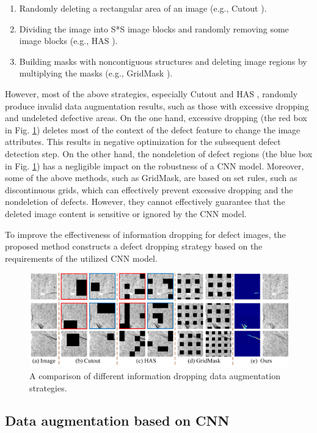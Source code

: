 \documentclass[sn-mathphys]{sn-jnl}%
\theoremstyle{thmstyleone}%
\theoremstyle{thmstyletwo}%
\theoremstyle{thmstylethree}%
\begin{document}
\begin{enumerate}[1)]
\item Randomly deleting a rectangular area of an image (e.g., Cutout \cite{devries2017improved}).
\item Dividing the image into S*S image blocks and randomly removing some image blocks (e.g., HAS \cite{singh2017hide}).
\item Building masks with noncontiguous structures and deleting image regions by multiplying the masks (e.g., GridMask \cite{chen2020gridmask}).
\end{enumerate}

However, most of the above strategies, especially Cutout\cite{devries2017improved} and HAS \cite{singh2017hide}, randomly produce invalid data augmentation results, such as those with excessive dropping and undeleted defective areas. On the one hand, excessive dropping (the red box in Fig. \ref{fig:3.3.1}) deletes most of the context of the defect feature to change the image attributes. This results in negative optimization for the subsequent defect detection step. On the other hand, the nondeletion of defect regions (the blue box in Fig. \ref{fig:3.3.1}) has a negligible impact on the robustness of a CNN model. Moreover, some of the above methods, such as GridMask, are based on set rules, such as discontinuous grids, which can effectively prevent excessive dropping and the nondeletion of defects. However, they cannot effectively guarantee that the deleted image content is sensitive or ignored by the CNN model.

To improve the effectiveness of information dropping for defect images, the proposed method constructs a defect dropping strategy based on the requirements of the utilized CNN model.

\begin{figure}
\centering
\includegraphics[width=4.5in]{fig5.jpg}
\caption{A comparison of different information dropping data augmentation strategies.}\label{fig:3.3.1}
\end{figure}


\subsection{Data augmentation based on CNN}\label{sec:In}
\end{document}
